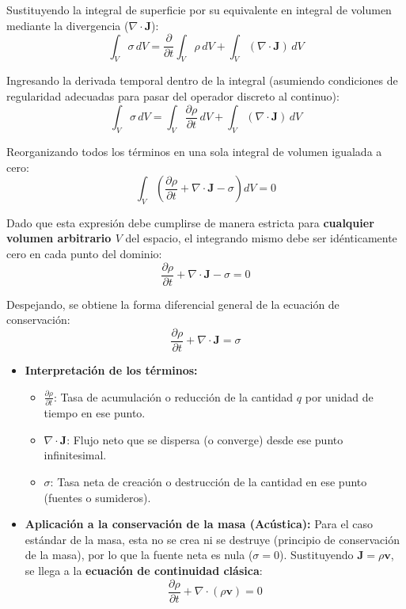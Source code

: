 \documentclass[11pt,letterpaper]{article}
\begin{document}
Sustituyendo la integral de superficie por su equivalente en integral de volumen mediante la divergencia ($\nabla \cdot \mathbf{J}$):
\begin{equation}
    \int_V \sigma \, dV = \frac{\partial}{\partial t} \int_V \rho \, dV + \int_V (\nabla \cdot \mathbf{J}) \, dV
\end{equation}

Ingresando la derivada temporal dentro de la integral (asumiendo condiciones de regularidad adecuadas para pasar del operador discreto al continuo):
\begin{equation}
    \int_V \sigma \, dV = \int_V \frac{\partial \rho}{\partial t} \, dV + \int_V (\nabla \cdot \mathbf{J}) \, dV
\end{equation}

Reorganizando todos los términos en una sola integral de volumen igualada a cero:
\begin{equation}
    \int_V \left( \frac{\partial \rho}{\partial t} + \nabla \cdot \mathbf{J} - \sigma \right) dV = 0
\end{equation}

Dado que esta expresión debe cumplirse de manera estricta para \textbf{cualquier volumen arbitrario $V$} del espacio, el integrando mismo debe ser idénticamente cero en cada punto del dominio:
\begin{equation}
    \frac{\partial \rho}{\partial t} + \nabla \cdot \mathbf{J} - \sigma = 0
\end{equation}

Despejando, se obtiene la forma diferencial general de la ecuación de conservación:
\begin{equation}
    \frac{\partial \rho}{\partial t} + \nabla \cdot \mathbf{J} = \sigma
\end{equation}

\begin{itemize}
    \item \textbf{Interpretación de los términos:}
    \begin{itemize}
        \item $\frac{\partial \rho}{\partial t}$: Tasa de acumulación o reducción de la cantidad $q$ por unidad de tiempo en ese punto.
        \item $\nabla \cdot \mathbf{J}$: Flujo neto que se dispersa (o converge) desde ese punto infinitesimal.
        \item $\sigma$: Tasa neta de creación o destrucción de la cantidad en ese punto (fuentes o sumideros).
    \end{itemize}
    
    \item \textbf{Aplicación a la conservación de la masa (Acústica):} Para el caso estándar de la masa, esta no se crea ni se destruye (principio de conservación de la masa), por lo que la fuente neta es nula ($\sigma = 0$). Sustituyendo $\mathbf{J} = \rho \mathbf{v}$, se llega a la \textbf{ecuación de continuidad clásica}:
    \begin{equation}
        \frac{\partial \rho}{\partial t} + \nabla \cdot (\rho \mathbf{v}) = 0
    \end{equation}
\end{itemize}
\end{document}
